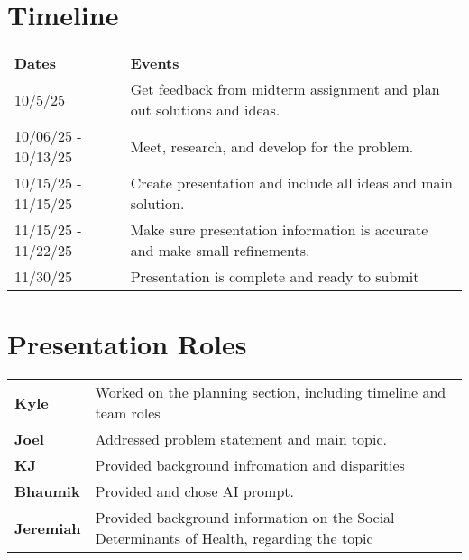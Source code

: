 \documentclass[11pt]{article}
\begin{document}
\section{Timeline}
\label{sec:org85e1b73}
\begin{center}
\begin{tabular}{ll}
\textbf{Dates} & \textbf{Events}\\
10/5/25 & Get feedback from midterm assignment and plan out solutions and ideas.\\
10/06/25 - 10/13/25 & Meet, research, and develop for the problem.\\
10/15/25 - 11/15/25 & Create presentation and include all ideas and main solution.\\
11/15/25 - 11/22/25 & Make sure presentation information is accurate and make small refinements.\\
11/30/25 & Presentation is complete and ready to submit\\
\end{tabular}
\end{center}
\section{Presentation Roles}
\label{sec:orgeb6a9aa}
\begin{center}
\begin{tabular}{ll}
\textbf{Kyle} & Worked on the planning section, including timeline and team roles\\
\textbf{Joel} & Addressed problem statement and main topic.\\
\textbf{KJ} & Provided background infromation and disparities\\
\textbf{Bhaumik} & Provided and chose AI prompt.\\
\textbf{Jeremiah} & Provided background information on the Social Determinants of Health, regarding the topic\\
\end{tabular}
\end{center}
\end{document}

